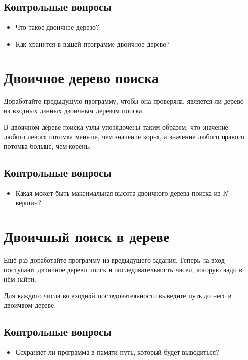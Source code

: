 \documentclass[10pt,twoside,openany]{book}
\begin{document}
\subsection*{Контрольные вопросы}

\begin{itemize}
    \item Что такое двоичное дерево?
    \item Как хранится в вашей программе двоичное дерево?
\end{itemize}

\section{Двоичное дерево поиска}

Доработайте предыдущую программу, чтобы она проверяла, является ли дерево из входных
данных двоичным деревом поиска.

В двоичном дереве поиска узлы упорядочены таким образом, что значение любого левого потомка
меньше, чем значение корня, а значение любого правого потомка больше, чем корень.

\subsection*{Контрольные вопросы}

\begin{itemize}
    \item Какая может быть максимальная высота двоичного дерева поиска из $N$ вершин?
\end{itemize}

\section{Двоичный поиск в дереве}

Ещё раз доработайте программу из предыдущего задания.
Теперь на вход поступают двоичное дерево поиск и последовательность чисел, которую надо в нём
найти.

Для каждого числа во входной последовательности выведите путь до него в двоичном дереве.

\subsection*{Контрольные вопросы}

\begin{itemize}
    \item Сохраняет ли программа в памяти путь, который будет выводиться?
\end{itemize}
\end{document}
